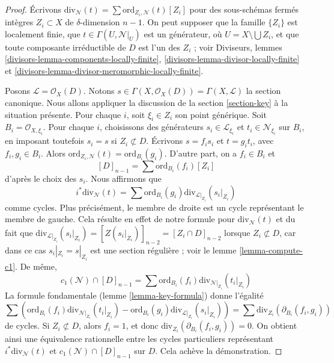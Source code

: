 \begin{proof}
Écrivons $\text{div}_\mathcal{N}(t) = \sum \text{ord}_{Z_i, \mathcal{N}}(t)[Z_i]$
pour des sous-schémas fermés intègres $Z_i \subset X$ de $\delta$-dimension
$n - 1$. On peut supposer que la famille $\{Z_i\}$ est localement
finie, que $t \in \Gamma(U, \mathcal{N}|_U)$ est un générateur,
où $U = X \setminus \bigcup Z_i$, et que toute composante irréductible
de $D$ est l'un des $Z_i$ ; voir
Diviseurs, lemmes \ref{divisors-lemma-components-locally-finite},
\ref{divisors-lemma-divisor-locally-finite} et
\ref{divisors-lemma-divisor-meromorphic-locally-finite}.

\medskip\noindent
Posons $\mathcal{L} = \mathcal{O}_X(D)$. Notons
$s \in \Gamma(X, \mathcal{O}_X(D)) = \Gamma(X, \mathcal{L})$
la section canonique. Nous allons appliquer la discussion de la
section \ref{section-key} à la situation présente.
Pour chaque $i$, soit $\xi_i \in Z_i$ son point générique. Soit
$B_i = \mathcal{O}_{X, \xi_i}$. Pour chaque $i$, choisissons des générateurs
$s_i \in \mathcal{L}_{\xi_i}$ et $t_i \in \mathcal{N}_{\xi_i}$
sur $B_i$, en imposant toutefois $s_i = s$ si $Z_i \not \subset D$.
Écrivons $s = f_i s_i$ et $t = g_i t_i$, avec $f_i, g_i \in B_i$.
Alors $\text{ord}_{Z_i, \mathcal{N}}(t) = \text{ord}_{B_i}(g_i)$.
D'autre part, on a $f_i \in B_i$ et
$$
[D]_{n - 1} = \sum \text{ord}_{B_i}(f_i)[Z_i]
$$
d'après le choix des $s_i$. Nous affirmons que
$$
i^*\text{div}_\mathcal{N}(t) =
\sum \text{ord}_{B_i}(g_i) \text{div}_{\mathcal{L}|_{Z_i}}(s_i|_{Z_i})
$$
comme cycles. Plus précisément, le membre de droite est un cycle
représentant le membre de gauche. Cela résulte en effet de notre
formule pour $\text{div}_\mathcal{N}(t)$ et du fait que
$\text{div}_{\mathcal{L}|_{Z_i}}(s_i|_{Z_i}) = [Z(s_i|_{Z_i})]_{n - 2} =
[Z_i \cap D]_{n - 2}$ lorsque $Z_i \not \subset D$, car dans
ce cas $s_i|_{Z_i} = s|_{Z_i}$ est une section régulière ; voir le
lemme \ref{lemma-compute-c1}. De même,
$$
c_1(\mathcal{N}) \cap [D]_{n - 1} =
\sum \text{ord}_{B_i}(f_i) \text{div}_{\mathcal{N}|_{Z_i}}(t_i|_{Z_i})
$$
La formule fondamentale (lemme \ref{lemma-key-formula}) donne l'égalité
$$
\sum \left(
\text{ord}_{B_i}(f_i) \text{div}_{\mathcal{N}|_{Z_i}}(t_i|_{Z_i}) -
\text{ord}_{B_i}(g_i) \text{div}_{\mathcal{L}|_{Z_i}}(s_i|_{Z_i}) \right) =
\sum \text{div}_{Z_i}(\partial_{B_i}(f_i, g_i))
$$
de cycles. Si $Z_i \not \subset D$, alors $f_i = 1$, et donc
$\text{div}_{Z_i}(\partial_{B_i}(f_i, g_i)) = 0$. On obtient ainsi une équivalence
rationnelle entre les cycles particuliers représentant
$i^*\text{div}_\mathcal{N}(t)$ et $c_1(\mathcal{N}) \cap [D]_{n - 1}$
sur $D$. Cela achève la démonstration.
\end{proof}

